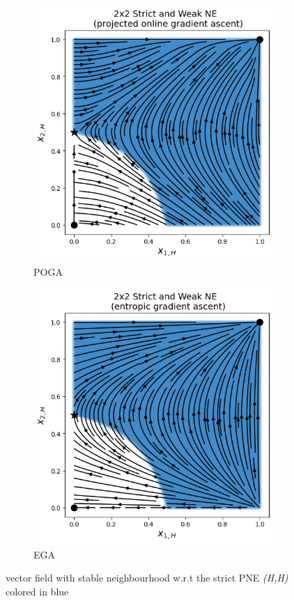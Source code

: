 \begin{figure}[H]
\captionsetup{justification=centering}
\centering
\begin{subfigure}{.5\textwidth}
    \centering
    \includegraphics[width=\textwidth]{logos/Weak1.png}
    \caption{POGA}
    \label{fig:Weak1a}
\end{subfigure}%
\begin{subfigure}{.5\textwidth}
    \centering
    \includegraphics[width=\textwidth]{logos/Weak2.png}
    \caption{EGA}
    \label{fig:Weak1b}
\end{subfigure}
\caption{vector field with stable neighbourhood w.r.t the strict PNE \textit{(H,H)} colored in blue}
\label{fig:2x2Weak1}
\end{figure}


